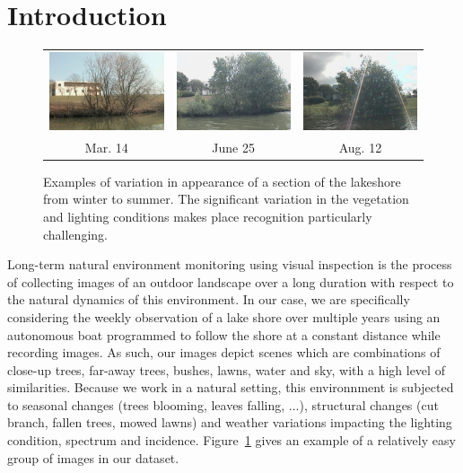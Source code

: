 \section{Introduction}
\begin{figure}[tb]
    \centering
    \begin{tabular}{c c c}
        \includegraphics[width=0.3\columnwidth]{siftflow-hard/140314-16329} &
        \includegraphics[width=0.3\columnwidth]{siftflow-hard/140625-23223}&
        \includegraphics[width=0.3\columnwidth]{siftflow-hard/140812-18224}  \\
        Mar. 14 & June 25 & Aug. 12\\
    \end{tabular}
    \caption{Examples of variation in appearance of a section of the lakeshore from winter to summer. The significant variation in the vegetation and lighting conditions makes place recognition particularly challenging.} 
    \label{fig:dataset-hard}
\end{figure}

\label{sec:intro}
Long-term natural environment monitoring using visual inspection is the process
of collecting images of an outdoor landscape over a long duration with respect
to the natural dynamics of this environment. In our case, we are specifically
considering the weekly observation of a lake shore over multiple years using an autonomous boat
programmed to follow the shore at a constant distance while recording images.
As such, our images depict scenes which are combinations of close-up trees, far-away trees, bushes,
lawns, water and sky, with a high level of similarities. Because we work in a
natural setting, this environnment is subjected to seasonal changes (trees
blooming, leaves falling, ...), structural changes (cut branch, fallen trees,
mowed lawns) and weather variations impacting the lighting condition, spectrum
and incidence. Figure~\ref{fig:dataset-hard} gives an example of a relatively easy group
of images in our dataset.

